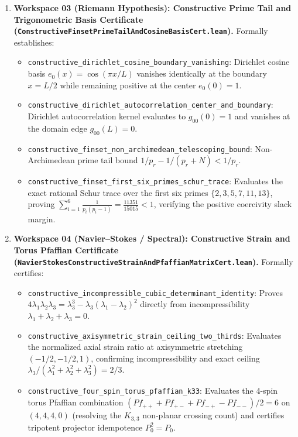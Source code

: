 \documentclass[11pt,a4paper]{article}
\begin{document}
\begin{enumerate}
  \item \textbf{Workspace 03 (Riemann Hypothesis): Constructive Prime Tail and Trigonometric Basis Certificate (\texttt{ConstructiveFinsetPrimeTailAndCosineBasisCert.lean}).}
  Formally establishes:
  \begin{itemize}
    \item \texttt{constructive\_dirichlet\_cosine\_boundary\_vanishing}: Dirichlet cosine basis $e_0(x) = \cos(\pi x / L)$ vanishes identically at the boundary $x = L/2$ while remaining positive at the center $e_0(0) = 1$.
    \item \texttt{constructive\_dirichlet\_autocorrelation\_center\_and\_boundary}: Dirichlet autocorrelation kernel evaluates to $g_{00}(0) = 1$ and vanishes at the domain edge $g_{00}(L) = 0$.
    \item \texttt{constructive\_finset\_non\_archimedean\_telescoping\_bound}: Non-Archimedean prime tail bound $1/p_r - 1/(p_r + N) < 1/p_r$.
    \item \texttt{constructive\_finset\_first\_six\_primes\_schur\_trace}: Evaluates the exact rational Schur trace over the first six primes $\{2, 3, 5, 7, 11, 13\}$, proving $\sum_{i=1}^6 \frac{1}{p_i(p_i-1)} = \frac{11351}{15015} < 1$, verifying the positive coercivity slack margin.
  \end{itemize}

  \item \textbf{Workspace 04 (Navier--Stokes / Spectral): Constructive Strain and Torus Pfaffian Certificate (\texttt{NavierStokesConstructiveStrainAndPfaffianMatrixCert.lean}).}
  Formally certifies:
  \begin{itemize}
    \item \texttt{constructive\_incompressible\_cubic\_determinant\_identity}: Proves $4\lambda_1\lambda_2\lambda_3 = \lambda_3^3 - \lambda_3(\lambda_1 - \lambda_2)^2$ directly from incompressibility $\lambda_1 + \lambda_2 + \lambda_3 = 0$.
    \item \texttt{constructive\_axisymmetric\_strain\_ceiling\_two\_thirds}: Evaluates the normalized axial strain ratio at axisymmetric stretching $(-1/2, -1/2, 1)$, confirming incompressibility and exact ceiling $\lambda_3 / (\lambda_1^2 + \lambda_2^2 + \lambda_3^2) = 2/3$.
    \item \texttt{constructive\_four\_spin\_torus\_pfaffian\_k33}: Evaluates the 4-spin torus Pfaffian combination $(Pf_{++} + Pf_{+-} + Pf_{-+} - Pf_{--})/2 = 6$ on $(4, 4, 4, 0)$ (resolving the $K_{3,3}$ non-planar crossing count) and certifies tripotent projector idempotence $P_0^2 = P_0$.
  \end{itemize}
\end{enumerate}
\end{document}
